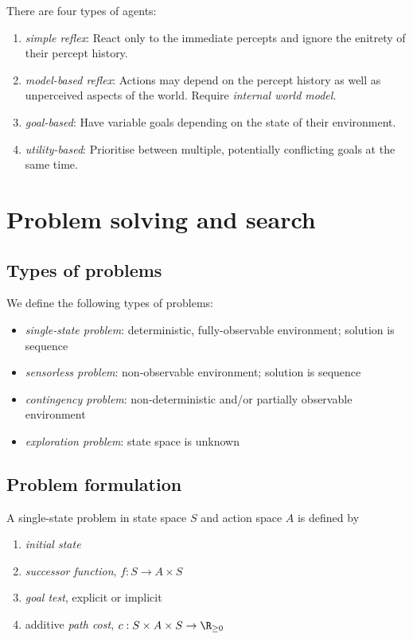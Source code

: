 \documentclass{article}
\begin{document}
\begin{definition}[R\&N p. 47]
	There are four types of agents:
	\begin{enumerate}
		\item \emph{simple reflex}: React only to the immediate percepts and ignore
		      the enitrety of their percept history.
		\item \emph{model-based reflex}: Actions may depend on the percept history
		      as well as unperceived aspects of the world. Require \emph{internal world
			      model}.
		\item \emph{goal-based}: Have variable goals depending on the state of their
		      environment.
		\item \emph{utility-based}: Prioritise between multiple, potentially conflicting
		      goals at the same time.
	\end{enumerate}
\end{definition}

\section{Problem solving and search}


\subsection{Types of problems}

\begin{definition}
	We define the following types of problems:
	\begin{itemize}
		\item \emph{single-state problem}: deterministic, fully-observable environment; solution is sequence
		\item \emph{sensorless problem}: non-observable environment; solution is sequence
		\item \emph{contingency problem}: non-deterministic and/or partially observable environment
		\item \emph{exploration problem}: state space is unknown
	\end{itemize}
\end{definition}

\subsection{Problem formulation}

\begin{definition}
	A single-state problem in state space $S$
	and action space $A$ is defined by
	\begin{enumerate}
		\item \emph{initial state}
		\item \emph{successor function}, $f:S\to A\times S$
		\item \emph{goal test}, explicit or implicit
		\item additive \emph{path cost}, $c:S\times A\times S\to\R_{\geq 0}$
	\end{enumerate}
\end{definition}
\end{document}
